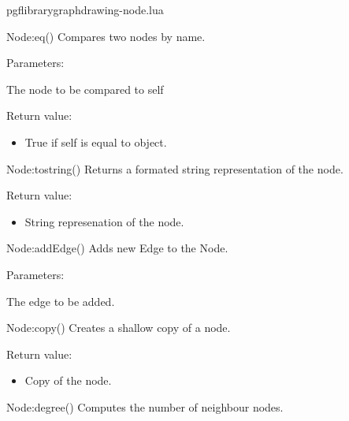 
\begin{filedescription}{pgflibrarygraphdrawing-node.lua}


\begin{luacommand}{{Node:\textunderscore{}\textunderscore{}eq}()}
Compares two nodes by name.

Parameters:
\begin{parameterdescription}
	\item[\meta{object}] The node to be compared to self
\end{parameterdescription}


Return value:
\begin{itemize} \item[] True if self is equal to object. \end{itemize}


\end{luacommand}\begin{luacommand}{{Node:\textunderscore{}\textunderscore{}tostring}()}
Returns a formated string representation of the node.


Return value:
\begin{itemize} \item[] String represenation of the node. \end{itemize}


\end{luacommand}\begin{luacommand}{{Node:addEdge}()}
Adds new Edge to the Node.

Parameters:
\begin{parameterdescription}
	\item[\meta{edge}] The edge to be added.
\end{parameterdescription}



\end{luacommand}\begin{luacommand}{{Node:copy}()}
Creates a shallow copy of a node.


Return value:
\begin{itemize} \item[] Copy of the node. \end{itemize}


\end{luacommand}\begin{luacommand}{{Node:degree}()}
Computes the number of neighbour nodes.



\end{luacommand}
\end{filedescription}
